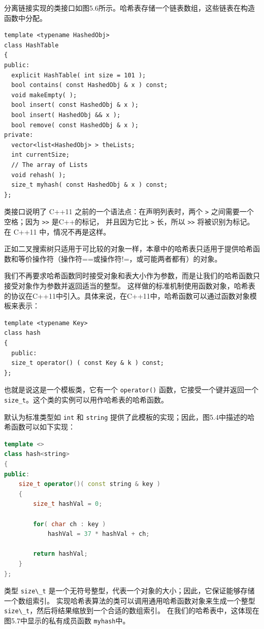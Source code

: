 \documentclass[a4paper]{ctexart}
\theoremstyle{definition}
\theoremstyle{definition}
\begin{document}
分离链接实现的类接口如图5.6所示。哈希表存储一个链表数组，这些链表在构造函数中分配。

\begin{lstlisting}
template <typename HashedObj>
class HashTable
{
public:
  explicit HashTable( int size = 101 );
  bool contains( const HashedObj & x ) const;
  void makeEmpty( );
  bool insert( const HashedObj & x );
  bool insert( HashedObj && x );
  bool remove( const HashedObj & x );
private:
  vector<list<HashedObj> > theLists;
  int currentSize;
  // The array of Lists
  void rehash( );
  size_t myhash( const HashedObj & x ) const;
};  
\end{lstlisting}

类接口说明了 C++11 之前的一个语法点：在声明列表时，两个 \verb|>| 之间需要一个空格；因为 \verb|>>| 是C++的标记，
并且因为它比 \verb|>| 长，所以 \verb|>>| 将被识别为标记。在 C++11 中，情况不再是这样。

正如二叉搜索树只适用于可比较的对象一样，本章中的哈希表只适用于提供哈希函数和等价操作符（操作符==或操作符!=，或可能两者都有）的对象。

我们不再要求哈希函数同时接受对象和表大小作为参数，而是让我们的哈希函数只接受对象作为参数并返回适当的整型。
这样做的标准机制使用函数对象，哈希表的协议在C++11中引入。具体来说，在C++11中，哈希函数可以通过函数对象模板来表示：

\begin{lstlisting}
template <typename Key>
class hash
{
  public:
  size_t operator() ( const Key & k ) const;
};
\end{lstlisting}

也就是说这是一个模板类，它有一个 \verb|operator()| 函数，它接受一个键并返回一个 \verb|size_t|。这个类的实例可以用作哈希表的哈希函数。

默认为标准类型如 \verb|int| 和 \verb|string| 提供了此模板的实现；因此，图5.4中描述的哈希函数可以如下实现：

\begin{lstlisting}[language=C++]
template <>
class hash<string>
{
public:
    size_t operator()( const string & key )
    {
        size_t hashVal = 0;

        for( char ch : key )
            hashVal = 37 * hashVal + ch;

        return hashVal;
    }
};
\end{lstlisting}

类型 \verb|size\_t| 是一个无符号整型，代表一个对象的大小；因此，它保证能够存储一个数组索引。
实现哈希表算法的类可以调用通用哈希函数对象来生成一个整型 \verb|size\_t|，然后将结果缩放到一个合适的数组索引。
在我们的哈希表中，这体现在图5.7中显示的私有成员函数 \verb|myhash|中。
\end{document}
